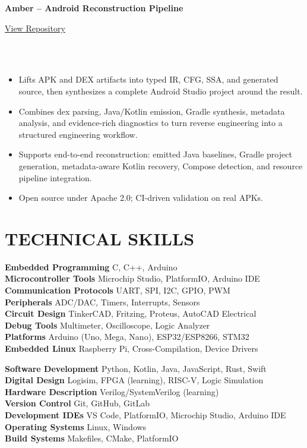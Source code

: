 \documentclass[11pt,a4paper]{article}
\newcommand{\projectentry}[4]{
    \noindent
    \begin{minipage}[t]{0.75\textwidth}
        \textbf{\color{accentred} #1}
    \end{minipage}%
    \begin{minipage}[t]{0.25\textwidth}
        \raggedleft
        \color{graytext}\small \href{#4}{View Repository}
    \end{minipage}\\[0.1em]
    \noindent {\color{graytext}\small #2} \\[0.3em]
    \noindent \small #3
    \vspace{1.2em}
}
\newcommand{\skillentry}[2]{
    \noindent \textbf{#1} \hfill \color{graytext} #2 \\
}
\begin{document}
\projectentry{Amber -- Android Reconstruction Pipeline}{Kotlin, DEX IR, SSA, JavaPoet, Gradle}{
    \begin{itemize}
        \item Lifts APK and DEX artifacts into typed IR, CFG, SSA, and generated source, then synthesizes a complete Android Studio project around the result.
        \item Combines dex parsing, Java/Kotlin emission, Gradle synthesis, metadata analysis, and evidence-rich diagnostics to turn reverse engineering into a structured engineering workflow.
        \item Supports end-to-end reconstruction: emitted Java baselines, Gradle project generation, metadata-aware Kotlin recovery, Compose detection, and resource pipeline integration.
        \item Open source under Apache 2.0; CI-driven validation on real APKs.
    \end{itemize}
}{https://github.com/edengilbertus/amber}

\section*{TECHNICAL SKILLS}

\begin{minipage}[t]{0.48\textwidth}
    \skillentry{Embedded Programming}{C, C++, Arduino}
    \skillentry{Microcontroller Tools}{Microchip Studio, PlatformIO, Arduino IDE}
    \skillentry{Communication Protocols}{UART, SPI, I2C, GPIO, PWM}
    \skillentry{Peripherals}{ADC/DAC, Timers, Interrupts, Sensors}
    \skillentry{Circuit Design}{TinkerCAD, Fritzing, Proteus, AutoCAD Electrical}
    \skillentry{Debug Tools}{Multimeter, Oscilloscope, Logic Analyzer}
    \skillentry{Platforms}{Arduino (Uno, Mega, Nano), ESP32/ESP8266, STM32}
    \skillentry{Embedded Linux}{Raspberry Pi, Cross-Compilation, Device Drivers}
\end{minipage}%
\hfill
\begin{minipage}[t]{0.48\textwidth}
    \skillentry{Software Development}{Python, Kotlin, Java, JavaScript, Rust, Swift}
    \skillentry{Digital Design}{Logisim, FPGA (learning), RISC-V, Logic Simulation}
    \skillentry{Hardware Description}{Verilog/SystemVerilog (learning)}
    \skillentry{Version Control}{Git, GitHub, GitLab}
    \skillentry{Development IDEs}{VS Code, PlatformIO, Microchip Studio, Arduino IDE}
    \skillentry{Operating Systems}{Linux, Windows}
    \skillentry{Build Systems}{Makefiles, CMake, PlatformIO}
\end{minipage}
\end{document}

